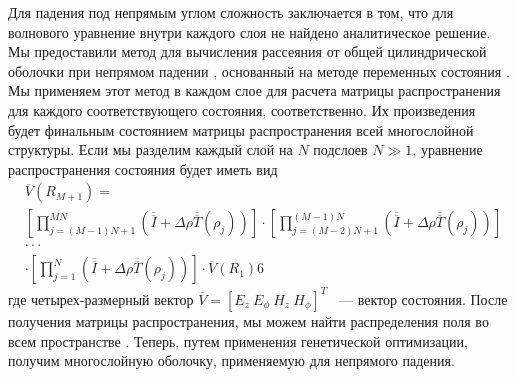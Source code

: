 \documentclass[a4paper, 12pt]{article}
\begin{document}
Для падения под непрямым углом сложность заключается в том, что для волнового 
уравнение внутри каждого слоя не найдено аналитическое решение. Мы предоставили
метод для вычисления рассеяния от общей цилиндрической оболочки при непрямом
падении \cite{14}, основанный на методе переменных состояния \cite{15}.
Мы применяем этот метод в каждом слое для расчета матрицы распространения для
каждого соответствующего состояния, соответственно. Их произведения будет 
финальным состоянием матрицы распространения всей многослойной структуры.
Если мы разделим каждый слой на $N$ подслоев $N \gg 1$, уравнение
распространения состояния будет иметь вид
\begin{eqnarray}
&\overline V (R_{M+1}) = \nonumber & \\
&\left[ \prod_{j=(M-1)N+1}^{MN}(\overline{\overline I} + \Delta \rho
\overline{\overline T}(\rho_{j})) \right]
 \nonumber \cdot \left[ \prod_{j=(M-2)N+1}^{(M-1)N}(\overline{\overline I} +
\Delta \rho \overline{\overline T}(\rho_{j})) \right]&\nonumber
\\
&\cdot \cdot \cdot & \nonumber
\\
 & \cdot \left[
\prod_{j=1}^{N}(\overline{\overline I} + \Delta \rho
\overline{\overline T}(\rho_{j})) \right] 
 \cdot \overline V (R_1)6&
\end{eqnarray}
где четырех-размерный вектор 
$\overline V = [E_z ~E_\phi ~H_z~H_\phi]^T$ ~--- вектор состояния. 
После получения матрицы распространения, мы можем найти распределения поля
во всем пространстве \cite{14}. 
Теперь, путем применения генетической оптимизации,
получим многослойную оболочку, применяемую для непрямого падения.
\end{document}
